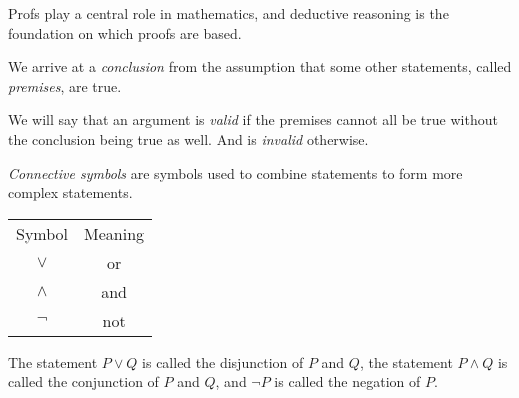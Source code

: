 Profs play a central role in mathematics, and deductive reasoning is the foundation on which proofs are based.

We arrive at a \textit{conclusion} from the assumption that some other statements, called \textit{premises}, are true.

We will say that an argument is \textit{valid} if the premises cannot all be true without the conclusion being true as well. And is \textit{invalid} otherwise.

\textit{Connective symbols} are symbols used to combine statements to form more complex statements.

\begin{center}
    \begin{tabular}{c | c}
        Symbol & Meaning \\
        $\lor$ & or \\
        $\land$ & and \\
        $\lnot$ & not \\
    \end{tabular}
\end{center}


The statement $P \lor Q$ is called the disjunction of $P$ and $Q$, the statement $P \land Q$ is called the conjunction of $P$ and $Q$, and $\lnot P$ is called the negation of $P$.